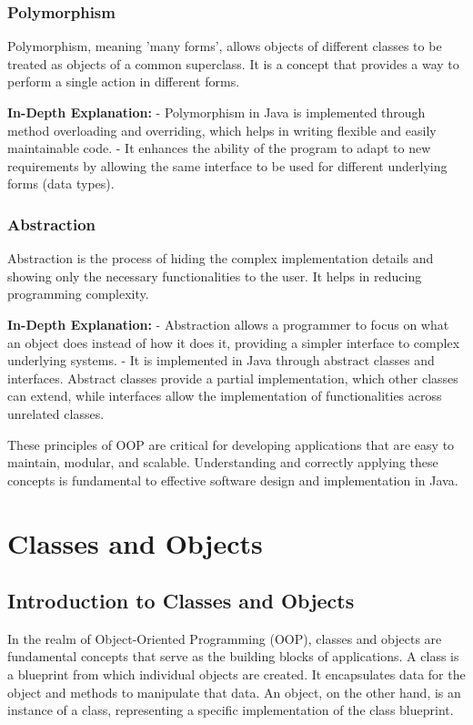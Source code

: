 \documentclass{article}
\begin{document}
\subsubsection{Polymorphism}
Polymorphism, meaning 'many forms', allows objects of different classes to be treated as objects of a common superclass. It is a concept that provides a way to perform a single action in different forms.

\textbf{In-Depth Explanation:}
- Polymorphism in Java is implemented through method overloading and overriding, which helps in writing flexible and easily maintainable code.
- It enhances the ability of the program to adapt to new requirements by allowing the same interface to be used for different underlying forms (data types).

\subsubsection{Abstraction}
Abstraction is the process of hiding the complex implementation details and showing only the necessary functionalities to the user. It helps in reducing programming complexity.

\textbf{In-Depth Explanation:}
- Abstraction allows a programmer to focus on what an object does instead of how it does it, providing a simpler interface to complex underlying systems.
- It is implemented in Java through abstract classes and interfaces. Abstract classes provide a partial implementation, which other classes can extend, while interfaces allow the implementation of functionalities across unrelated classes.

These principles of OOP are critical for developing applications that are easy to maintain, modular, and scalable. Understanding and correctly applying these concepts is fundamental to effective software design and implementation in Java.

\section{Classes and Objects}
\subsection{Introduction to Classes and Objects}
In the realm of Object-Oriented Programming (OOP), classes and objects are fundamental concepts that serve as the building blocks of applications. A class is a blueprint from which individual objects are created. It encapsulates data for the object and methods to manipulate that data. An object, on the other hand, is an instance of a class, representing a specific implementation of the class blueprint.
\end{document}
